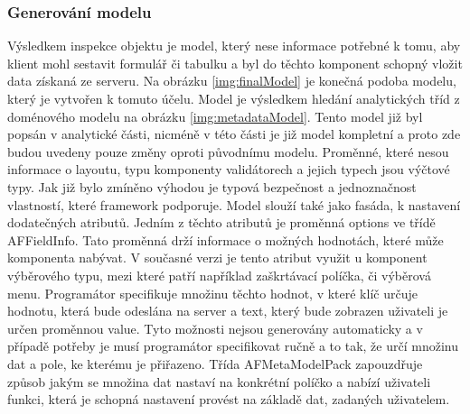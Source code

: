 \subsubsection{Generování modelu}
Výsledkem inspekce objektu je model, který nese informace potřebné k tomu, aby klient mohl sestavit formulář či tabulku a byl do těchto komponent schopný vložit data získaná ze serveru. Na obrázku \ref{img:finalModel} je konečná podoba modelu, který je vytvořen k tomuto účelu. Model je výsledkem hledání analytických tříd z doménového modelu na obrázku \ref{img:metadataModel}. Tento model již byl popsán v analytické části, nicméně v této části je již model kompletní a proto zde budou uvedeny pouze změny oproti původnímu modelu. Proměnné, které nesou informace o layoutu, typu komponenty validátorech a jejich typech jsou výčtové typy. Jak již bylo zmíněno výhodou je typová bezpečnost a jednoznačnost vlastností, které framework podporuje. Model slouží také jako fasáda, k nastavení dodatečných atributů. Jedním z těchto atributů je proměnná options ve třídě AFFieldInfo. Tato proměnná drží informace o možných hodnotách, které může komponenta nabývat. V současné verzi je tento atribut využit u komponent výběrového typu, mezi které patří například zaškrtávací políčka, či výběrová menu. Programátor specifikuje množinu těchto hodnot, v které klíč určuje hodnotu, která bude odeslána na server a text, který bude zobrazen uživateli je určen proměnnou value. Tyto možnosti nejsou generovány automaticky a v případě potřeby je musí programátor specifikovat ručně a to tak, že určí množinu dat a pole, ke kterému je přiřazeno. Třída AFMetaModelPack zapouzdřuje způsob jakým se množina dat nastaví na konkrétní políčko a nabízí uživateli funkci, která je schopná nastavení provést na základě dat, zadaných uživatelem.

